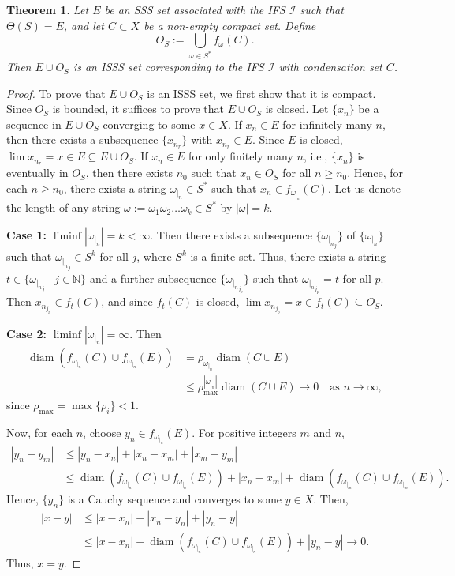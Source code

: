 \documentclass[12pt,oneside,reqno]{amsart}
\newtheorem{theorem}{Theorem}[section]
\theoremstyle{definition}
\theoremstyle{remark}
\begin{document}
\begin{theorem}
Let $E$ be an SSS set associated with the IFS $\mathcal{I}$ such that $\Theta(S) = E$, and let $C \subset X$ be a non-empty compact set. Define
\[
O_S := \bigcup_{{\omega} \in S^*} f_{{\omega}}(C).
\]
Then $ E\cup O_S$ is an ISSS set corresponding to the IFS $\mathcal{I}$ with condensation set $C$.
\end{theorem}
\begin{proof}
To prove that $E\cup O_S$ is an ISSS set, we first show that it is compact. Since $O_S$ is bounded, it suffices to prove that $E \cup O_S$ is closed. Let $\{x_n\}$ be a sequence in $E \cup O_S$ converging to some $x \in X$. If $x_n \in E$ for infinitely many $n$, then there exists a subsequence $\{x_{n_r}\}$ with $x_{n_r} \in E$. Since $E$ is closed, $\lim x_{n_r} = x \in E \subseteq E \cup O_S$. If $x_n \in E$ for only finitely many $n$, i.e., $\{x_n\}$ is eventually in $O_S$, then there exists $n_0$ such that $x_n \in O_S$ for all $n \geq n_0$. Hence, for each $n \geq n_0$, there exists a string $\omega_{|_n} \in S^*$ such that $x_n \in f_{\omega_{|_n}}(C)$.
Let us denote the length of any string $\omega := \omega_1 \omega_2 \dots \omega_k \in S^*$ by $|\omega|=k.$

\textbf{Case 1:} $\liminf |\omega_{|_n}| = k < \infty$. Then there exists a subsequence $\{\omega_{{|_n}_j}\}$ of $\{\omega_{|_n}\}$ such that $\omega_{{|_n}_j} \in S^k$ for all $j$, where $S^k$ is a finite set. Thus, there exists a string $t \in \{\omega_{{|_n}_j} \mid j \in \mathbb{N}\}$ and a further subsequence $\{\omega_{{|_n}_{j_p}}\}$ such that $\omega_{{|_n}_{j_p}} = t$ for all $p$. Then $x_{n_{j_p}} \in f_t(C)$, and since $f_t(C)$ is closed, $\lim x_{n_{j_p}} = x \in f_t(C) \subseteq O_S$.

\textbf{Case 2:} $\liminf |\omega_{|_n}| = \infty$. Then
\[
\begin{aligned}
\operatorname{diam}(f_{\omega_{|_n}}(C) \cup f_{\omega_{|_n}}(E)) &= \rho_{\omega_{|_n}} \operatorname{diam}(C \cup E) \\
&\leq \rho_{\max}^{|\omega_{|_n}|} \operatorname{diam}(C \cup E) \to 0 \quad \text{as } n \to \infty,
\end{aligned}
\]
since $\rho_{\max} = \max\{\rho_i\} < 1$.

Now, for each $n$, choose $y_n \in f_{\omega_{|_n}}(E)$. For positive integers $m$ and $n$,
\[
\begin{aligned}
|y_n - y_m| &\leq |y_n - x_n| + |x_n - x_m| + |x_m - y_m| \\
&\leq \operatorname{diam}(f_{\omega_{|_n}}(C) \cup f_{\omega_{|_n}}(E)) + |x_n - x_m| + \operatorname{diam}(f_{\omega_{|_m}}(C) \cup f_{\omega_{|_m}}(E)).
\end{aligned}
\]
Hence, $\{y_n\}$ is a Cauchy sequence and converges to some $y \in X$. Then,
\[
\begin{aligned}
|x - y| &\leq |x - x_n| + |x_n - y_n| + |y_n - y| \\
&\leq |x - x_n| + \operatorname{diam}(f_{\omega_{|_n}}(C) \cup f_{\omega_{|_n}}(E)) + |y_n - y| \to 0.
\end{aligned}
\]
Thus, $x = y$.


\end{proof}
\end{document}
